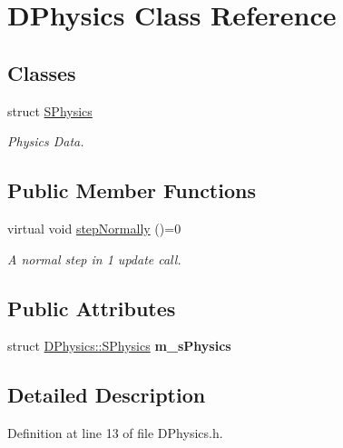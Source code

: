 \hypertarget{classDPhysics}{\section{D\-Physics Class Reference}
\label{classDPhysics}
}
\subsection*{Classes}
\begin{DoxyCompactItemize}
\item 
struct \hyperlink{structDPhysics_1_1SPhysics}{S\-Physics}
\begin{DoxyCompactList}\small\item\em Physics Data. \end{DoxyCompactList}\end{DoxyCompactItemize}
\subsection*{Public Member Functions}
\begin{DoxyCompactItemize}
\item 
virtual void \hyperlink{classDPhysics_a414316ffcec06dbf01ced086bbb92b55}{step\-Normally} ()=0
\begin{DoxyCompactList}\small\item\em A normal step in 1 update call. \end{DoxyCompactList}\end{DoxyCompactItemize}
\subsection*{Public Attributes}
\begin{DoxyCompactItemize}
\item 
\hypertarget{classDPhysics_aca2940879481f0e2b892c82c5fc0da5a}{struct \hyperlink{structDPhysics_1_1SPhysics}{D\-Physics\-::\-S\-Physics} {\bfseries m\-\_\-s\-Physics}}\label{classDPhysics_aca2940879481f0e2b892c82c5fc0da5a}

\end{DoxyCompactItemize}


\subsection{Detailed Description}


Definition at line 13 of file D\-Physics.\-h.



